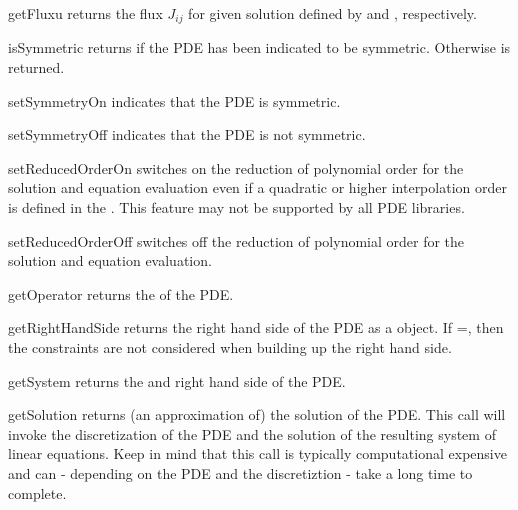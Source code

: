 \begin{methoddesc}[LinearPDE]{getFlux}{u}
returns the flux $J_{ij}$  for given solution 
defined by  and , respectively.
\end{methoddesc}


\begin{methoddesc}[LinearPDE]{isSymmetric}{}
returns \True if the PDE has been indicated to be symmetric.
Otherwise \False is returned.
\end{methoddesc}

\begin{methoddesc}[LinearPDE]{setSymmetryOn}{}
indicates that the PDE is symmetric.
\end{methoddesc}

\begin{methoddesc}[LinearPDE]{setSymmetryOff}{}
indicates that the PDE is not symmetric.
\end{methoddesc}

\begin{methoddesc}[LinearPDE]{setReducedOrderOn}{}
switches on the reduction of polynomial order for the solution and equation evaluation even if
a quadratic or higher interpolation order is defined in the \Domain. This feature may not
be supported by all PDE libraries.
\end{methoddesc}

\begin{methoddesc}[LinearPDE]{setReducedOrderOff}{}
switches off the reduction of polynomial order for the solution and
equation evaluation.
\end{methoddesc}

\begin{methoddesc}[LinearPDE]{getOperator}{}
returns the \Operator of the PDE.
\end{methoddesc}

\begin{methoddesc}[LinearPDE]{getRightHandSide}{}
returns the right hand side of the PDE as a \Data object. If
=\True, then the constraints are not considered
when building up the right hand side.
\end{methoddesc}

\begin{methoddesc}[LinearPDE]{getSystem}{}
returns the \Operator and right hand side of the PDE.
\end{methoddesc}

\begin{methoddesc}[LinearPDE]{getSolution}{}
returns (an approximation of) the solution of the PDE. This call
will invoke the discretization of the PDE and the solution of the resulting
system of linear equations. Keep in mind that this call is typically computational 
expensive and can - depending on the PDE and the discretiztion - take a long time to complete. 
\end{methoddesc}



